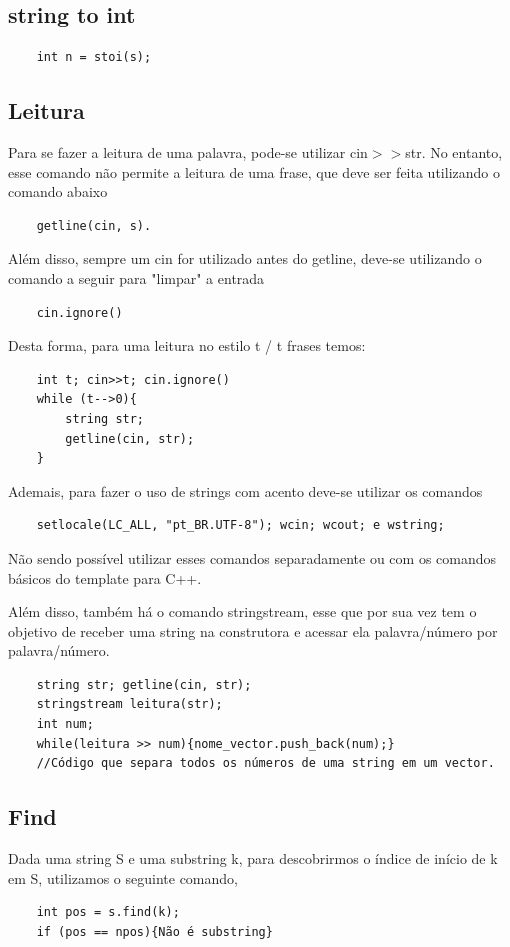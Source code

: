 \subsection{string to int}
\begin{verbatim}
    int n = stoi(s);
\end{verbatim}


\subsection{Leitura}
Para se fazer a leitura de uma palavra, pode-se utilizar cin$>>$str. No entanto, 
esse comando não permite a leitura de uma frase, que deve ser feita utilizando 
o comando abaixo
\begin{verbatim}
    getline(cin, s).
\end{verbatim}
Além disso, sempre um cin for utilizado antes do getline, deve-se utilizando o comando
a seguir para "limpar" a entrada
\begin{verbatim}
    cin.ignore()
\end{verbatim}
Desta forma, para uma leitura no estilo t / t frases temos:
\begin{verbatim}
    int t; cin>>t; cin.ignore()
    while (t-->0){
        string str;
        getline(cin, str);
    }
\end{verbatim}
Ademais, para fazer o uso de strings com acento deve-se utilizar os comandos
\begin{verbatim}
    setlocale(LC_ALL, "pt_BR.UTF-8"); wcin; wcout; e wstring;
\end{verbatim}
Não sendo possível utilizar esses comandos separadamente ou com os comandos
básicos do template para C++.

Além disso, também há o comando stringstream, esse que por sua vez tem o objetivo de
receber uma string na construtora e acessar ela palavra/número por palavra/número.
\begin{verbatim}
    string str; getline(cin, str);
    stringstream leitura(str);
    int num;
    while(leitura >> num){nome_vector.push_back(num);}
    //Código que separa todos os números de uma string em um vector.
\end{verbatim}

\subsection{Find}
Dada uma string S e uma substring k, para descobrirmos o índice de início de k em S, 
utilizamos o seguinte comando,
\begin{verbatim}
    int pos = s.find(k);
    if (pos == npos){Não é substring}
\end{verbatim}



